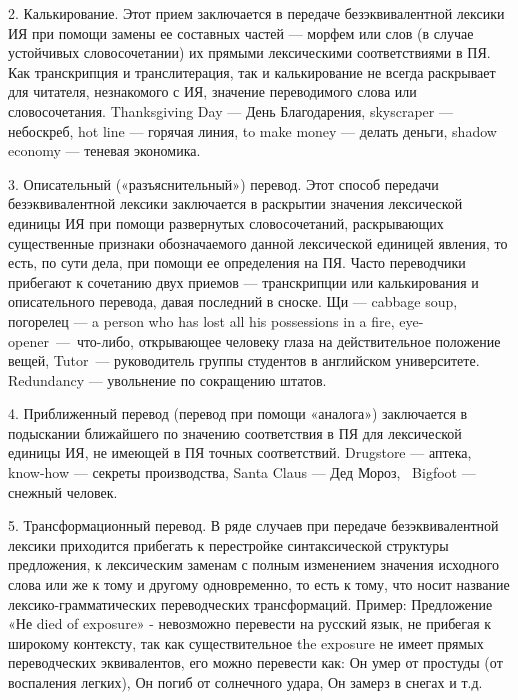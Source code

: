 2. Калькирование. Этот прием заключается в передаче безэквивалентной лексики ИЯ при помощи замены ее составных частей --- морфем или слов (в случае устойчивых словосочетании) их прямыми лексическими соответствиями в ПЯ.  Как транскрипция и транслитерация, так и калькирование не всегда раскрывает для читателя, незнакомого с ИЯ, значение переводимого слова или словосочетания. Thanksgiving Day --- День Благодарения, skyscraper --- небоскреб, hot line --- горячая линия, to make money --- делать деньги, shadow economy --- теневая экономика.

3. Описательный («разъяснительный») перевод. Этот способ передачи безэквивалентной лексики заключается в раскрытии значения лексической единицы ИЯ при помощи развернутых словосочетаний, раскрывающих существенные признаки обозначаемого данной лексической единицей явления, то есть, по сути дела, при помощи ее определения на ПЯ. Часто переводчики прибегают к сочетанию двух приемов --- транскрипции или калькирования и описательного перевода, давая последний в сноске. Щи --- cabbage soup, погорелец  --- a person who has lost all his possessions in a fire, eye-opener --- что-либо, открывающее человеку глаза на действительное положение вещей, Tutor --- руководитель группы студентов в английском университете. Redundancy --- увольнение по сокращению штатов.

4. Приближенный перевод (перевод при помощи «аналога») заключается в подыскании ближайшего по значению соответствия в ПЯ для лексической единицы ИЯ, не имеющей в ПЯ точных соответствий. Drugstore --- аптека, know-how ---  секреты производства, Santa Claus --- Дед Мороз,  Bigfoot --- снежный человек.

5. Трансформационный перевод. В ряде случаев при передаче безэквивалентной лексики приходится прибегать к перестройке синтаксической структуры предложения, к лексическим заменам с полным изменением значения исходного слова или же к тому и другому одновременно, то есть к тому, что носит название лексико-грамматических переводческих трансформаций. Пример: Предложение «Не died of exposure» - невозможно перевести на русский язык, не прибегая к широкому контексту, так как существительное the exposure не имеет прямых переводческих эквивалентов, его можно перевести как: Он умер от простуды (от воспаления легких), Он погиб от солнечного удара, Он замерз в снегах и т.д. 